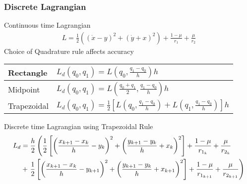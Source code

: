 \begin{frame}[shrink=20] %
\frametitle{Discrete Lagrangian}
	Continuous time Lagrangian
	\begin{align*}
		L = \frac{1}{2} \left( \left( \dot{x} -y \right)^2 + \left( \dot{y} + x \right)^2 \right) + \frac{1-\mu}{r_1} + \frac{\mu}{r_2}
	\end{align*}
	Choice of Quadrature rule affects accuracy
	\begin{table}[htbp]
		\centering
		\begin{tabular}{l|l}Rectangle & \( L_d(q_0,q_1) =L(q_0,\frac{q_1-q_0}{h}) h \)  \\ \hline \hline
		Midpoint & \( L_d(q_0,q_1) = L(\frac{q_0 + q_1}{2},\frac{q_1 - q_0}{h}) h \) \\ \hline \hline
		Trapezoidal & \( L_d(q_0, q_1) = \frac{1}{2} \left[ L(q_0, \frac{q_1 - q_0}{h} ) + L(q_1, \frac{q_1 - q_0 }{h} )\right] h \)
		\end{tabular} 
	\end{table}
	Discrete time Lagrangian using Trapezoidal Rule
	\begin{align*}
		L_d &= \frac{h}{2} \left( \frac{1}{2} \left[ \left(  \frac{x_{k+1} - x_k}{h} -y_{k} \right)^2 + \left( \frac{y_{k+1} - y_{k}}{h} + x_k \right)^2 \right] + \frac{1 - \mu}{r_{1_k}} + \frac{\mu}{r_{2_k}} \right. \nonumber \\ 
	&+ \left. \frac{1}{2} \left[ \left(  \frac{x_{k+1} - x_k}{h} -y_{k+1} \right)^2 + \left( \frac{y_{k+1} - y_{k}}{h} + x_{k+1} \right)^2 \right] + \frac{1-\mu}{r_{1_{k+1}}} + \frac{\mu}{r_{2_{k+1}}}  \right)
	\end{align*}
	
\end{frame} %

